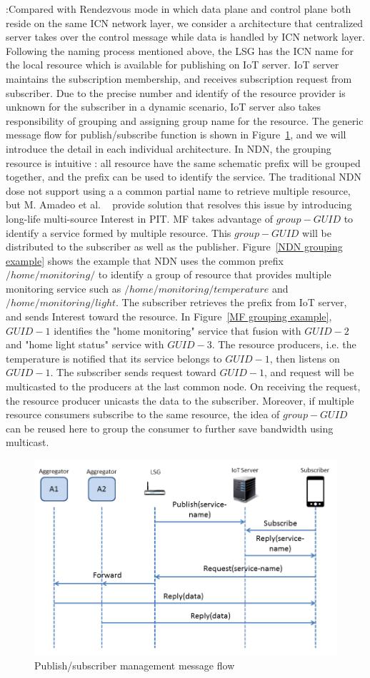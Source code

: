 \vspace{1mm}:Compared with Rendezvous mode in which data plane and control plane both reside on the same ICN network layer, we consider a architecture that centralized server takes over the control message while data is handled by ICN network layer. Following the naming process mentioned above, the LSG has the ICN name for the local resource which is available for publishing on IoT server. IoT server maintains the subscription membership, and receives subscription request from subscriber. Due to the precise number and identify of the resource provider is unknown for the subscriber in a dynamic scenario, IoT server also takes responsibility of grouping and assigning group name for the resource. The generic message flow for publish/subscribe function is shown in Figure~\ref{fig:pubsub}, and we will introduce the detail in each individual architecture.
In NDN, the grouping resource is intuitive : all resource have the same schematic prefix will be grouped together, and the prefix can be used to identify the service. The traditional NDN dose not support using a a common partial name to retrieve multiple resource, but M. Amadeo et al. ~\cite{**Multi-source paper**} provide solution that resolves this issue by introducing long-life multi-source Interest in PIT.
MF takes advantage of  $group-GUID$ to identify a service formed by multiple resource. This $group-GUID$ will be distributed to the subscriber as well as the publisher. Figure~\ref{NDN grouping example} shows the example that NDN uses the common prefix$/home/monitoring/$ to identify a group of resource that provides multiple monitoring service such as $/home/monitoring/temperature$ and $/home/monitoring/light$. The subscriber retrieves the prefix from IoT server, and sends Interest toward the resource. In Figure~\ref{MF grouping example}, $GUID-1$ identifies the "home monitoring" service that fusion with $GUID-2$ and "home light status" service with $GUID-3$. The resource producers, i.e. the temperature is notified that its service belongs to $GUID-1$, then listens on $GUID-1$. The subscriber sends request toward  $GUID-1$, and request will be multicasted to the producers at the last common node. On receiving the request, the resource producer unicasts the data to the subscriber. Moreover, if multiple resource consumers subscribe to the same resource,
the idea of $group-GUID$ can be reused here to group the consumer to further save bandwidth using multicast.
\begin{figure}
\includegraphics[width=\columnwidth]{figure/pub_sub.png}
\caption{\label{fig:pubsub}Publish/subscriber management message flow}
\end{figure}
